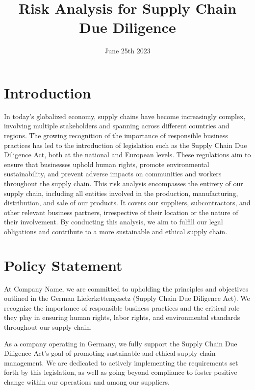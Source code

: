 \documentclass{article}
\title{Risk Analysis for Supply Chain Due Diligence}
\author{\companyname}
\date{June 25th 2023}
\def\companyname{Company Name}
\begin{document}
\maketitle
\thispagestyle{empty}

\newpage

\tableofcontents

\newpage

\section{Introduction}

In today's globalized economy, supply chains have become increasingly complex, involving multiple stakeholders and spanning across different countries and regions.
The growing recognition of the importance of responsible business practices has led to the introduction of legislation such as the Supply Chain Due Diligence Act,
both at the national and European levels. These regulations aim to ensure that businesses uphold human rights, promote environmental sustainability, and prevent
adverse impacts on communities and workers throughout the supply chain. This risk analysis encompasses the entirety of our supply chain, including all entities
involved in the production, manufacturing, distribution, and sale of our products. It covers our suppliers, subcontractors, and other relevant business partners,
irrespective of their location or the nature of their involvement. By conducting this analysis, we aim to fulfill our legal obligations and contribute to a more
sustainable and ethical supply chain.


\section{Policy Statement}

At \companyname, we are committed to upholding the principles and objectives outlined in the German Lieferkettengesetz (Supply Chain Due Diligence Act).
We recognize the importance of responsible business practices and the critical role they play in ensuring human rights, labor rights, and environmental
standards throughout our supply chain.

As a company operating in Germany, we fully support the Supply Chain Due Diligence Act's goal of promoting sustainable and ethical supply chain management. We are
dedicated to actively implementing the requirements set forth by this legislation, as well as going beyond compliance to foster positive change within our
operations and among our suppliers.
\end{document}
